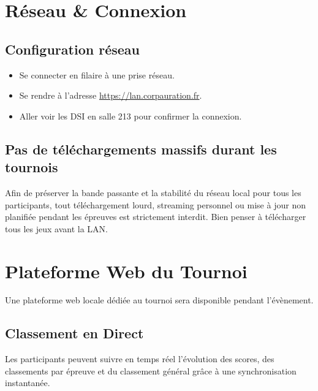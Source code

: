 \documentclass[11pt,a4paper]{article}
\begin{document}
    \section{Réseau \& Connexion}

    \subsection{Configuration réseau}
    \begin{itemize}
        \item Se connecter en filaire à une prise réseau.
        \item Se rendre à l'adresse \url{https://lan.corpauration.fr}.
        \item Aller voir les DSI en salle 213 pour confirmer la connexion.

    \end{itemize}

    \subsection{Pas de téléchargements massifs durant les tournois}
    Afin de préserver la bande passante et la stabilité du réseau local pour tous les participants, tout téléchargement lourd, streaming personnel ou mise à jour non planifiée pendant les épreuves est strictement interdit.
    Bien penser à télécharger tous les jeux avant la LAN\@.


    \section{Plateforme Web du Tournoi}

    Une plateforme web locale dédiée au tournoi sera disponible pendant l'évènement.

    \subsection{Classement en Direct}
    Les participants peuvent suivre en temps réel l'évolution des scores, des classements par épreuve et du classement général grâce à une synchronisation instantanée.
\end{document}
